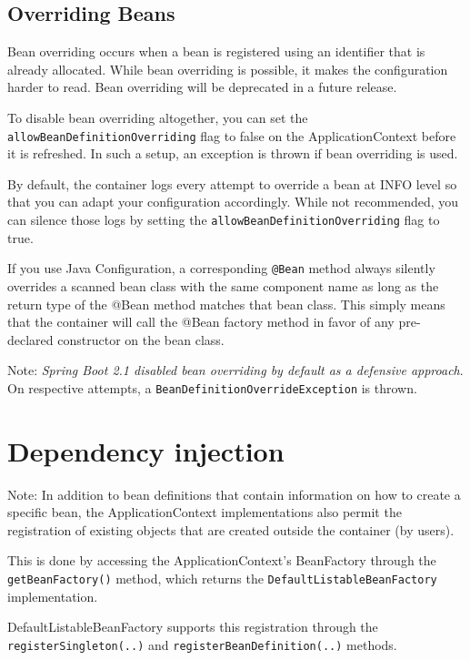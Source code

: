 \documentclass{scrartcl}
\begin{document}
\subsection{Overriding Beans}

Bean overriding occurs when a bean is registered using an identifier that is already allocated. While bean overriding is possible, it makes the configuration harder to read.
Bean overriding will be deprecated in a future release.

To disable bean overriding altogether, you can set the \lstinline|allowBeanDefinitionOverriding| flag to false on the ApplicationContext before it is refreshed. In such a setup, an exception is thrown if bean overriding is used.

By default, the container logs every attempt to override a bean at INFO level so that you can adapt your configuration accordingly. While not recommended, you can silence those logs by setting the \lstinline|allowBeanDefinitionOverriding| flag to true.

If you use Java Configuration, a corresponding \lstinline|@Bean| method always silently overrides a scanned bean class with the same component name as long as the return type of the @Bean method matches that bean class. This simply means that the container will call the @Bean factory method in favor of any pre-declared constructor on the bean class.

Note:
\textit{Spring Boot 2.1 disabled bean overriding by default as a defensive approach}. On respective attempts, a \lstinline{BeanDefinitionOverrideException} is thrown.



\section{Dependency injection}

Note: In addition to bean definitions that contain information on how to create a specific bean, the ApplicationContext implementations also permit the registration of existing objects that are created outside the container (by users).

This is done by accessing the ApplicationContext’s BeanFactory through the \lstinline{getBeanFactory()} method, which returns the \lstinline{DefaultListableBeanFactory} implementation.

DefaultListableBeanFactory supports this registration through the \lstinline{registerSingleton(..)} and \lstinline{registerBeanDefinition(..)} methods.
\end{document}
